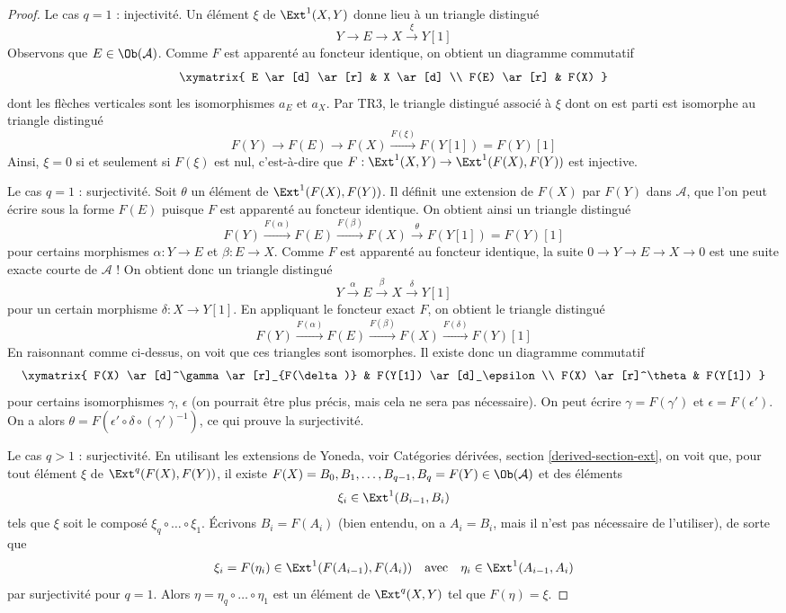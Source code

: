 \begin{proof}
\medskip\noindent
Le cas $q = 1$ : injectivité. Un élément $\xi$ de $\Ext^1(X, Y)$
donne lieu à un triangle distingué
$$
Y \to E \to X \xrightarrow{\xi} Y[1]
$$
Observons que $E \in \Ob(\mathcal{A})$. Comme $F$ est apparenté au
foncteur identique, on obtient un diagramme commutatif
$$
\xymatrix{
E \ar[d] \ar[r] & X \ar[d] \\
F(E) \ar[r] & F(X)
}
$$
dont les flèches verticales sont les isomorphismes $a_E$ et $a_X$.
Par TR3, le triangle distingué associé à $\xi$ dont on est parti
est isomorphe au triangle distingué
$$
F(Y) \to F(E) \to F(X) \xrightarrow{F(\xi)} F(Y[1]) = F(Y)[1]
$$
Ainsi, $\xi = 0$ si et seulement si $F(\xi)$ est nul, c'est-à-dire que
$F : \Ext^1(X, Y) \to \Ext^1(F(X), F(Y))$ est injective.

\medskip\noindent
Le cas $q = 1$ : surjectivité. Soit $\theta$ un élément de
$\Ext^1(F(X), F(Y))$. Il définit une extension de $F(X)$ par $F(Y)$
dans $\mathcal{A}$, que l'on peut écrire sous la forme $F(E)$
puisque $F$ est apparenté au foncteur identique. On obtient ainsi un triangle
distingué
$$
F(Y) \xrightarrow{F(\alpha)} F(E)
\xrightarrow{F(\beta)} F(X)
\xrightarrow{\theta} F(Y[1]) = F(Y)[1]
$$
pour certains morphismes $\alpha : Y \to E$ et $\beta : E \to X$.
Comme $F$ est apparenté au foncteur identique, la suite
$0 \to Y \to E \to X \to 0$
est une suite exacte courte de $\mathcal{A}$ ! On obtient donc un
triangle distingué
$$
Y \xrightarrow{\alpha} E \xrightarrow{\beta} X \xrightarrow{\delta} Y[1]
$$
pour un certain morphisme $\delta : X \to Y[1]$. En appliquant le foncteur exact
$F$, on obtient le triangle distingué
$$
F(Y) \xrightarrow{F(\alpha)} F(E) \xrightarrow{F(\beta)} F(X)
\xrightarrow{F(\delta)} F(Y)[1]
$$
En raisonnant comme ci-dessus, on voit que ces triangles sont isomorphes.
Il existe donc un diagramme commutatif
$$
\xymatrix{
F(X) \ar[d]^\gamma \ar[r]_{F(\delta)} & F(Y[1]) \ar[d]_\epsilon \\
F(X) \ar[r]^\theta & F(Y[1])
}
$$
pour certains isomorphismes $\gamma$, $\epsilon$ (on pourrait être plus précis, mais cela
ne sera pas nécessaire). On peut écrire $\gamma = F(\gamma')$ et
$\epsilon = F(\epsilon')$. On a alors
$\theta = F(\epsilon' \circ \delta \circ (\gamma')^{-1})$,
ce qui prouve la surjectivité.

\medskip\noindent
Le cas $q > 1$ : surjectivité. En utilisant les extensions de Yoneda, voir
Catégories dérivées, section \ref{derived-section-ext}, on voit que, pour tout
élément $\xi$ de $\Ext^q(F(X), F(Y))$, il existe
$F(X) = B_0, B_1, \ldots, B_{q - 1}, B_q = F(Y) \in \Ob(\mathcal{A})$ et des
éléments
$$
\xi_i \in \Ext^1(B_{i - 1}, B_i)
$$
tels que $\xi$ soit le composé $\xi_q \circ \ldots \circ \xi_1$.
Écrivons $B_i = F(A_i)$ (bien entendu, on a $A_i = B_i$, mais il n'est pas
nécessaire de l'utiliser), de sorte que
$$
\xi_i = F(\eta_i) \in \Ext^1(F(A_{i - 1}), F(A_i))
\quad\text{avec}\quad
\eta_i \in \Ext^1(A_{i - 1}, A_i)
$$
par surjectivité pour $q = 1$. Alors $\eta = \eta_q \circ \ldots \circ \eta_1$
est un élément de $\Ext^q(X, Y)$ tel que $F(\eta) = \xi$.


\end{proof}
